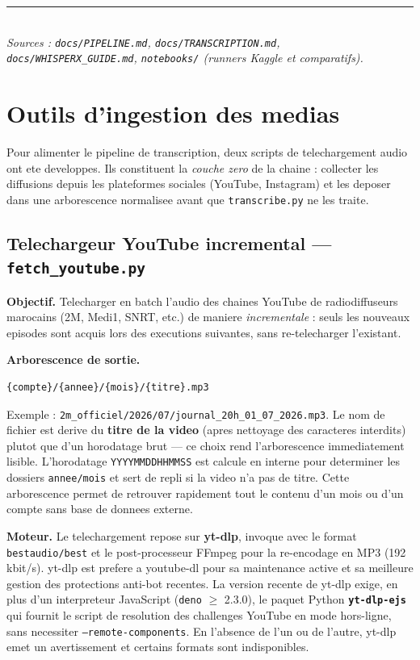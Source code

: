 \documentclass[11pt, a4paper]{article}
\begin{document}
\vspace{4pt}
\rule{\linewidth}{0.4pt}\\[2pt]
{\footnotesize\itshape Sources : \texttt{docs/PIPELINE.md}, \texttt{docs/TRANSCRIPTION.md},
\texttt{docs/WHISPERX\_GUIDE.md}, \texttt{notebooks/} (runners Kaggle et comparatifs).}

\section{Outils d'ingestion des medias}

Pour alimenter le pipeline de transcription, deux scripts de telechargement audio ont ete
developpes. Ils constituent la \emph{couche zero} de la chaine : collecter les diffusions
depuis les plateformes sociales (YouTube, Instagram) et les deposer dans une arborescence
normalisee avant que \texttt{transcribe.py} ne les traite.

\subsection{Telechargeur YouTube incremental — \texttt{fetch\_youtube.py}}

\textbf{Objectif.} Telecharger en batch l'audio des chaines YouTube de radiodiffuseurs
marocains (2M, Medi1, SNRT, etc.) de maniere \emph{incrementale} : seuls les nouveaux
episodes sont acquis lors des executions suivantes, sans re-telecharger l'existant.

\textbf{Arborescence de sortie.}
\begin{lstlisting}
{compte}/{annee}/{mois}/{titre}.mp3
\end{lstlisting}
Exemple : \texttt{2m\_officiel/2026/07/journal\_20h\_01\_07\_2026.mp3}.
Le nom de fichier est derive du \textbf{titre de la video} (apres nettoyage des
caracteres interdits) plutot que d'un horodatage brut --- ce choix rend l'arborescence
immediatement lisible. L'horodatage \texttt{YYYYMMDDHHMMSS} est calcule en interne
pour determiner les dossiers \texttt{annee/mois} et sert de repli si la video n'a
pas de titre. Cette arborescence permet de retrouver rapidement tout le contenu d'un
mois ou d'un compte sans base de donnees externe.

\textbf{Moteur.} Le telechargement repose sur \textbf{yt-dlp}, invoque avec le format
\texttt{bestaudio/best} et le post-processeur FFmpeg pour la re-encodage en MP3
(192 kbit/s). yt-dlp est prefere a youtube-dl pour sa maintenance active et sa meilleure
gestion des protections anti-bot recentes. La version recente de yt-dlp exige, en plus
d'un interpreteur JavaScript (\texttt{deno} $\geq$ 2.3.0), le paquet Python
\textbf{\texttt{yt-dlp-ejs}} qui fournit le script de resolution des challenges YouTube
en mode hors-ligne, sans necessiter \texttt{--remote-components}. En l'absence de l'un
ou de l'autre, yt-dlp emet un avertissement et certains formats sont indisponibles.
\end{document}

